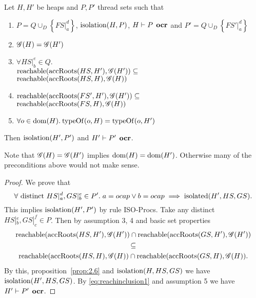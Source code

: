 \begin{proposition} \label{prop:2.11}
  Let $H, H'$ be heaps and $P, P'$ thread sets such that
  \begin{enumerate}
    \item $P = Q \cup_D \left\{ FS|_a^d \right\}$, $\mbox{$\mathrm{isolation}$}{(H, P)}$, $H
      \vdash P \:\: \mbox{\bf ocr}$ and $P' = Q \cup_D \left\{ FS'|_a^d \right\}$
    \item $\mathscr{G}{(H)} = \mathscr{G}{(H')}$
    \item $\forall HS|_b^e \in Q.$ \\ 
      $\mbox{$\mathrm{reachable}$}{(\mbox{$\mathrm{accRoots}$}{(HS, H')}, \ensuremath{\mathscr{G}}{(H')})} \subseteq$ \\
      $\mbox{$\mathrm{reachable}$}{(\mbox{$\mathrm{accRoots}$}{(HS, H)}, \ensuremath{\mathscr{G}}{(H)})}$
    \item $\mbox{$\mathrm{reachable}$}{(\mbox{$\mathrm{accRoots}$}{(FS', H')}, \ensuremath{\mathscr{G}}{(H')})} \subseteq$ \\
      $\mbox{$\mathrm{reachable}$}{(\mbox{$\mathrm{accRoots}$}{(FS, H)}, \ensuremath{\mathscr{G}}{(H)})}$
    \item $\forall o \in \mbox{$\mathrm{dom}$}{(H)}. \: \mbox{$\mathrm{typeOf}$}{(o, H)} = \mbox{$\mathrm{typeOf}$}{(o, H')}$
  \end{enumerate}
  Then $\mbox{$\mathrm{isolation}$}{(H', P')}$ and $H' \vdash P' \:\: \mbox{\bf ocr}$.
\end{proposition}

\begin{remark}
  Note that $\mathscr{G}{(H)} = \mathscr{G}{(H')}$ implies $\mbox{$\mathrm{dom}$}{(H)} = \mbox{$\mathrm{dom}$}{(H')}$.
  Otherwise many of the preconditions above would not make sense.
\end{remark}

\begin{proof}
  We prove that 
  \begin{equation*}
    \forall \text{ distinct } HS|_a^d, GS|_b^e \in P'.\; a = \mbox{$ocap$} \lor b = \mbox{$ocap$} \implies
    \mbox{$\mathrm{isolated}$}(H', HS, GS).
  \end{equation*}
  This implies $\mbox{$\mathrm{isolation}$}(H', P')$ by rule {\sc ISO-Procs}.
  Take any distinct $HS|_b^e, GS|_c^f \in P$. Then by assumption 3, 4 and basic set
  properties
  \begin{equation} \label{eq:reachinclusion1}
    \begin{gathered}
      \mbox{$\mathrm{reachable}$}(\mbox{$\mathrm{accRoots}$}(HS, H'), \mathscr{G}(H')) \cap \mbox{$\mathrm{reachable}$}(\mbox{$\mathrm{accRoots}$}(GS, H'),
      \mathscr{G}(H')) \\
      \subseteq \\
      \mbox{$\mathrm{reachable}$}(\mbox{$\mathrm{accRoots}$}(HS, H), \mathscr{G}(H)) \cap \mbox{$\mathrm{reachable}$}(\mbox{$\mathrm{accRoots}$}(GS, H),
      \mathscr{G}(H)).
    \end{gathered}
  \end{equation}
  By this, proposition~\ref{prop:2.6} and $\mbox{$\mathrm{isolation}$}(H, HS, GS)$ we have
  $\mbox{$\mathrm{isolation}$}(H', HS, GS)$. By \eqref{eq:reachinclusion1} and assumption 5
  we have $H' \vdash P' \:\: \mbox{\bf ocr}$.
\end{proof}

